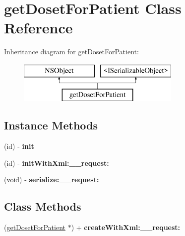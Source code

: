 \hypertarget{interfaceget_doset_for_patient}{}\section{get\+Doset\+For\+Patient Class Reference}
\label{interfaceget_doset_for_patient}
Inheritance diagram for get\+Doset\+For\+Patient\+:\begin{figure}[H]
\begin{center}
\leavevmode
\includegraphics[height=2.000000cm]{interfaceget_doset_for_patient}
\end{center}
\end{figure}
\subsection*{Instance Methods}
\begin{DoxyCompactItemize}
\item 
\hypertarget{interfaceget_doset_for_patient_a43733d17d75b65dfdf362618af64cd1f}{}(id) -\/ {\bfseries init}\label{interfaceget_doset_for_patient_a43733d17d75b65dfdf362618af64cd1f}

\item 
\hypertarget{interfaceget_doset_for_patient_a6bfdaf1d17cc0b34ccc8fa3317f4ebd0}{}(id) -\/ {\bfseries init\+With\+Xml\+:\+\_\+\+\_\+request\+:}\label{interfaceget_doset_for_patient_a6bfdaf1d17cc0b34ccc8fa3317f4ebd0}

\item 
\hypertarget{interfaceget_doset_for_patient_a1427969b48fc2235ce9bc6f32131cf28}{}(void) -\/ {\bfseries serialize\+:\+\_\+\+\_\+request\+:}\label{interfaceget_doset_for_patient_a1427969b48fc2235ce9bc6f32131cf28}

\end{DoxyCompactItemize}
\subsection*{Class Methods}
\begin{DoxyCompactItemize}
\item 
\hypertarget{interfaceget_doset_for_patient_a2388e5d27b063d4dc2b53d6796e1cd9a}{}(\hyperlink{interfaceget_doset_for_patient}{get\+Doset\+For\+Patient} $\ast$) + {\bfseries create\+With\+Xml\+:\+\_\+\+\_\+request\+:}\label{interfaceget_doset_for_patient_a2388e5d27b063d4dc2b53d6796e1cd9a}

\end{DoxyCompactItemize}
